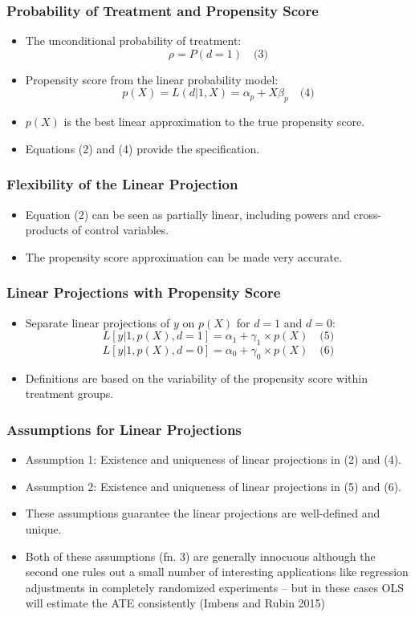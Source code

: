 \begin{frame}
\frametitle{Probability of Treatment and Propensity Score}
\begin{itemize}
    \item The unconditional probability of treatment:
    \[ \rho = P(d = 1) \quad \text{(3)} \]
    \item Propensity score from the linear probability model:
    \[ p(X) = L(d | 1, X) = \alpha_p + X\beta_p \quad \text{(4)} \]
    \item \( p(X) \) is the best linear approximation to the true propensity score.
    \item Equations (2) and (4) provide the specification.
\end{itemize}
\end{frame}

\begin{frame}
\frametitle{Flexibility of the Linear Projection}
\begin{itemize}
    \item Equation (2) can be seen as partially linear, including powers and cross-products of control variables.
    \item The propensity score approximation can be made very accurate.
\end{itemize}
\end{frame}

\begin{frame}
\frametitle{Linear Projections with Propensity Score}
\begin{itemize}
    \item Separate linear projections of \( y \) on \( p(X) \) for \( d = 1 \) and \( d = 0 \):
    \[ L[y | 1, p(X), d = 1] = \alpha_1 + \gamma_1 \times p(X) \quad \text{(5)} \]
    \[ L[y | 1, p(X), d = 0] = \alpha_0 + \gamma_0 \times p(X) \quad \text{(6)} \]
    \item Definitions are based on the variability of the propensity score within treatment groups.
\end{itemize}
\end{frame}

\begin{frame}
\frametitle{Assumptions for Linear Projections}
\begin{itemize}
    \item Assumption 1: Existence and uniqueness of linear projections in (2) and (4).
    \item Assumption 2: Existence and uniqueness of linear projections in (5) and (6).
    \item These assumptions guarantee the linear projections are well-defined and unique.
    \item Both of these assumptions (fn. 3) are generally innocuous although the second one rules out a small number of interesting applications like regression adjustments in completely randomized experiments -- but in these cases OLS will estimate the ATE consistently (Imbens and Rubin 2015)
\end{itemize}
\end{frame}


